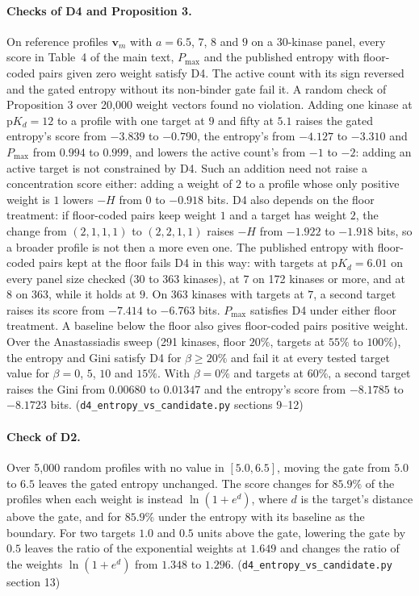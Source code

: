 \documentclass[11pt]{article}
\begin{document}
\paragraph{Checks of D4 and Proposition 3.} On reference profiles
$\mathbf{v}_m$ with $a = 6.5$, $7$, $8$ and $9$ on a 30-kinase panel, every
score in Table~4 of the main text, $P_{\max}$ and the published entropy
with floor-coded pairs given zero weight satisfy D4. The active count with its sign reversed and the gated entropy
without its non-binder gate fail it. A random check of Proposition 3 over
20{,}000 weight vectors found no violation. Adding one kinase at
$\mathrm{p}K_d = 12$ to a profile with one target at $9$ and fifty at $5.1$
raises the gated entropy's score from $-3.839$ to $-0.790$, the entropy's from
$-4.127$ to $-3.310$ and $P_{\max}$ from $0.994$ to $0.999$, and lowers the
active count's from $-1$ to $-2$: adding an active target is not constrained by
D4. Such an addition need not raise a concentration score either: adding a
weight of $2$ to a profile whose only positive weight is $1$ lowers $-H$ from
$0$ to $-0.918$ bits. D4 also depends on the floor treatment: if floor-coded
pairs keep weight $1$ and a target has weight $2$, the change from
$(2, 1, 1, 1)$ to $(2, 2, 1, 1)$ raises $-H$ from $-1.922$ to $-1.918$ bits, so
a broader profile is not then a more even one. The published entropy with
floor-coded pairs kept at the floor fails D4 in this way: with targets at
$\mathrm{p}K_d = 6.01$ on every panel size checked (30 to 363 kinases), at $7$
on 172 kinases or more, and at $8$ on 363, while it holds at $9$. On 363
kinases with targets at $7$, a second target raises its score from $-7.414$ to
$-6.763$ bits. $P_{\max}$ satisfies D4 under either floor treatment. A
baseline below the floor also gives floor-coded pairs positive weight. Over the
Anastassiadis sweep (291 kinases, floor $20\%$, targets at $55\%$ to $100\%$),
the entropy and Gini satisfy D4 for $\beta \geq 20\%$ and fail it at every
tested target value for $\beta = 0$, $5$, $10$ and $15\%$. With $\beta = 0\%$
and targets at $60\%$, a second target raises the Gini from $0.00680$ to
$0.01347$ and the entropy's score from $-8.1785$ to $-8.1723$ bits.
(\texttt{d4\_\allowbreak{}entropy\_\allowbreak{}vs\_\allowbreak{}candidate.py} sections
9--12)

\paragraph{Check of D2.} Over 5{,}000 random profiles with no value in
$[5.0, 6.5]$, moving the gate from $5.0$ to $6.5$ leaves the gated entropy
unchanged. The score changes for $85.9\%$ of the profiles when each weight is
instead $\ln(1 + e^{d})$, where $d$ is the target's distance above the gate,
and for $85.9\%$ under the entropy with its baseline as the boundary. For two
targets $1.0$ and $0.5$ units above the gate, lowering the gate by $0.5$ leaves
the ratio of the exponential weights at $1.649$ and changes the ratio of the
weights $\ln(1 + e^{d})$ from $1.348$ to $1.296$.
(\texttt{d4\_\allowbreak{}entropy\_\allowbreak{}vs\_\allowbreak{}candidate.py}
section 13)
\end{document}
